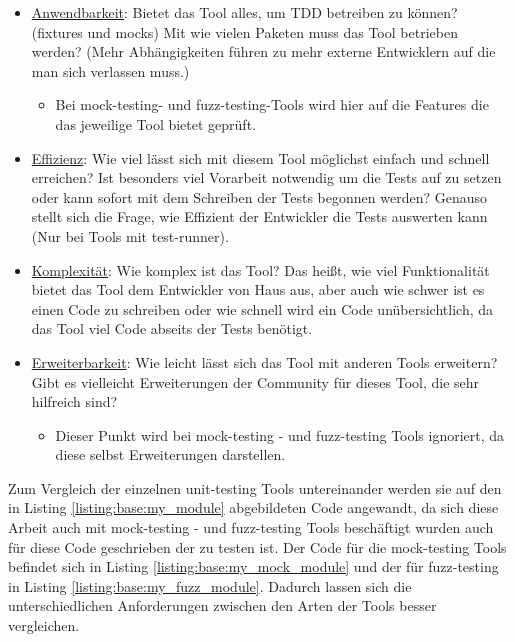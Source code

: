 \begin{itemize}
    \item \underline{Anwendbarkeit}:\newline
    Bietet das Tool alles, um TDD betreiben zu können? (\Glspl{fixture} und \Glspl{mock})
    Mit wie vielen Paketen muss das Tool betrieben werden? (Mehr Abhängigkeiten führen zu
    mehr externe Entwicklern auf die man sich verlassen muss.)
    \begin{itemize}
        \item Bei \gls{mock}-testing- und \gls{fuzz}-testing-Tools wird hier auf die
        Features die das jeweilige Tool bietet geprüft.
    \end{itemize}
    
    \item \underline{Effizienz}:\newline
    Wie viel lässt sich mit diesem Tool möglichst einfach und
    schnell erreichen? Ist besonders viel Vorarbeit notwendig um die Tests
    auf zu setzen oder kann sofort mit dem Schreiben der Tests begonnen
    werden?
    \newline
    Genauso stellt sich die Frage, wie Effizient der Entwickler die Tests
    auswerten kann (Nur bei Tools mit test-runner).
    
    \item \underline{Komplexität}:\newline
    Wie komplex ist das Tool? Das heißt, wie viel Funktionalität
    bietet das Tool dem Entwickler von Haus aus, aber auch wie schwer
    ist es einen Code zu schreiben oder wie schnell wird ein Code unübersichtlich, da
    das Tool viel Code abseits der Tests benötigt.
    
    \item \underline{Erweiterbarkeit}:\newline
    Wie leicht lässt sich das Tool mit anderen Tools erweitern?
    Gibt es vielleicht Erweiterungen der Community für dieses Tool, die sehr
    hilfreich sind?
    \begin{itemize}
        \item Dieser Punkt wird bei \gls{mock}-testing - und \gls{fuzz}-testing Tools ignoriert,
        da diese selbst Erweiterungen darstellen.
    \end{itemize}
\end{itemize}
\noindent
Zum Vergleich der einzelnen unit-testing Tools untereinander werden sie auf den in Listing
\ref{listing:base:my_module} abgebildeten Code angewandt, da sich diese Arbeit auch mit
\gls{mock}-testing - und \gls{fuzz}-testing Tools beschäftigt wurden auch für diese
Code geschrieben der zu testen ist. Der Code für die \gls{mock}-testing Tools befindet sich
in Listing \ref{listing:base:my_mock_module} und der für \gls{fuzz}-testing in Listing
\ref{listing:base:my_fuzz_module}. Dadurch lassen sich die unterschiedlichen Anforderungen
zwischen den Arten der Tools besser vergleichen.

